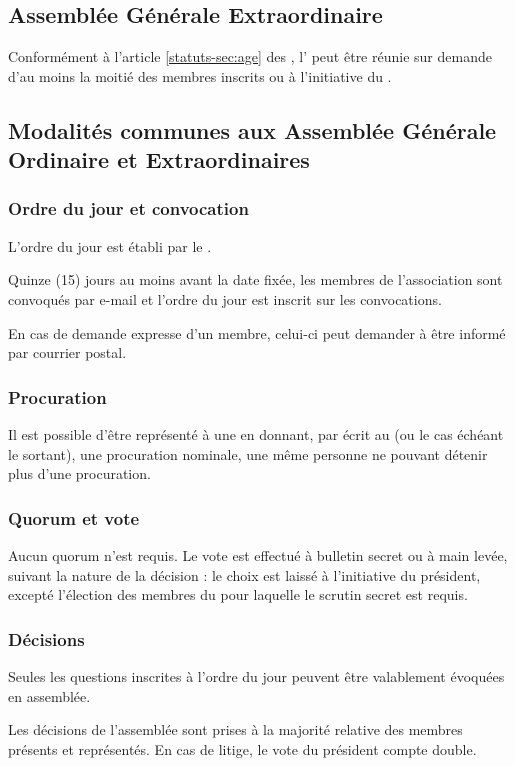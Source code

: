 \documentclass[a4paper,french,10pt]{article}
\newcommand{\article}[1]{\subsection{#1}\addtocounter{article}{1}}
\newcounter{article}
\newcommand{\artrefst}[1]{article \ref{statuts-#1} des \statuts{}}
\begin{document}
\article{Assemblée Générale Extraordinaire}
\label{sec:age}
Conformément à l'\artrefst{sec:age}, l'\AGE{} peut être réunie sur demande d'au moins la moitié des membres inscrits ou à l'initiative du \bureau{}.

\article{Modalités communes aux Assemblée Générale Ordinaire et Extraordinaires}
\label{sec:ag}

\subsubsection*{Ordre du jour et convocation}

L'ordre du jour est établi par le \bureau{}.

Quinze (15) jours au moins avant la date fixée, les membres de
l’association sont convoqués par e-mail et l’ordre du jour est inscrit
sur les convocations.

En cas de demande expresse d'un membre, celui-ci peut demander à être
informé par courrier postal.

\subsubsection*{Procuration}

Il est possible d’être représenté à une \AG{} en donnant,
par écrit au \bureau{} (ou le cas échéant le \bureau{} sortant), une procuration nominale, une même personne ne pouvant détenir plus
d’une procuration.

\subsubsection*{Quorum et vote}

Aucun quorum n'est requis. Le vote est effectué à bulletin secret ou à
main levée, suivant la nature de la décision : le choix est laissé à
l'initiative du président, excepté l'élection des membres du \bureau{}
pour laquelle le scrutin secret est requis.


\subsubsection*{Décisions}

Seules les questions inscrites à l’ordre du jour peuvent être
valablement évoquées en assemblée.

Les décisions de l’assemblée sont prises à la majorité relative des
membres présents et représentés. En cas de litige, le vote du
président compte double.
\end{document}
